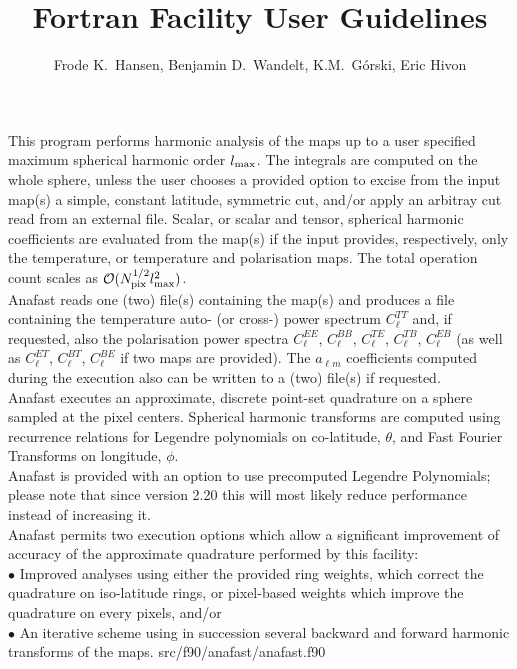 
\sloppy


\title{\healpix Fortran Facility User Guidelines}
 \section[anafast]{\nosectionname}
\label{fac:anafast}
\author{Frode K.~Hansen, Benjamin D.~Wandelt, K.M.~G\'orski, Eric Hivon}

\begin{facility}
{This program performs harmonic analysis of the \healpix maps 
up to a user
specified maximum spherical harmonic order $l_{\mathrm{max}}$.
The integrals are computed on the whole sphere, unless the user 
chooses  a provided option 
to excise from the input map(s) a simple, constant latitude, symmetric cut, and/or
apply an arbitray cut read from an external file.
Scalar, or scalar and tensor, spherical harmonic coefficients are evaluated
from the map(s) if the input provides, respectively, only the temperature,
or temperature and polarisation maps.
The total operation count scales as 
${\cal {O}}(N_{\mathrm{pix}}^{1/2}l_{\mathrm{max}}^2 )$. %
\\ %
Anafast reads one (two) file(s) containing the map(s) and produces 
a file containing the temperature auto- (or cross-) power spectrum
$C^{TT}_\ell$ and, if requested, 
also the polarisation power spectra $C^{EE}_\ell$, $C^{BB}_\ell$, $C^{TE}_\ell$,
$C^{TB}_\ell$, $C^{EB}_\ell$ (as well as  $C^{ET}_\ell$,
$C^{BT}_\ell$, $C^{BE}_\ell$ if two maps are provided).
The $a_{\ell m}$  coefficients computed during the execution also can be  
written to a (two) file(s) if requested. %
\\ %
Anafast executes an approximate, discrete point-set quadrature on 
a sphere
sampled at the \healpix pixel centers.
Spherical harmonic transforms are computed 
using recurrence relations for Legendre polynomials on co-latitude, 
$\theta$, 
and  Fast Fourier Transforms on longitude, $\phi$. %
\\%
Anafast is provided with an option to use precomputed Legendre Polynomials;
please note that since version 2.20 this will most likely reduce performance
instead of increasing it. %
\\%
Anafast permits two execution options 
which allow a significant improvement of accuracy of 
the approximate quadrature performed by this facility:%
\\ %
$\bullet$ Improved analyses using either the provided ring weights, 
which correct the quadrature on iso-latitude rings, or pixel-based weights which 
improve the quadrature on every pixels, and/or  %
\\%
$\bullet$ An iterative scheme using in 
succession several backward and forward harmonic transforms 
of the maps.}%
{src/f90/anafast/anafast.f90}
\end{facility}

